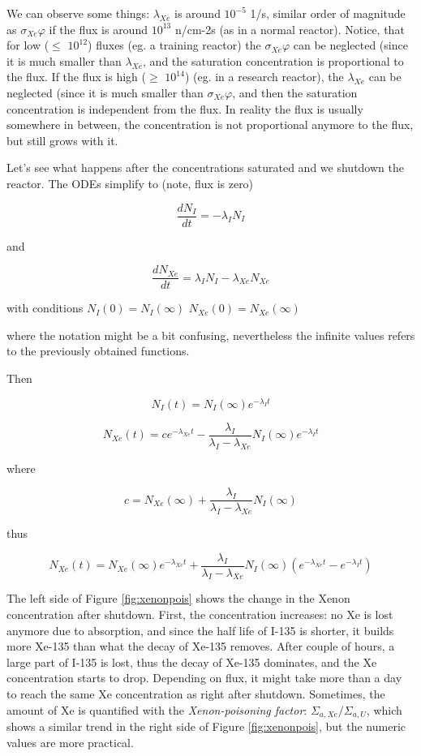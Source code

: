 We can observe some things: $\lambda_{Xe}$ is around $10^{-5}$ 1/s, similar order of magnitude as $\sigma_{Xe}\varphi$ if the flux is around $10^{13}$ n/cm-2s (as in a normal reactor).  Notice, that for low ($\leq$ $10^{12}$) fluxes (eg. a training reactor)  the $\sigma_{Xe}\varphi$ can be neglected (since it is much smaller than $\lambda_{Xe}$, and the saturation concentration is proportional to the flux. If the flux is high ($\geq$ $10^{14}$) (eg. in a research reactor), the $\lambda_{Xe}$ can be neglected (since it is much smaller than $\sigma_{Xe}\varphi$, and then the saturation concentration is independent from the flux. In reality the flux is usually somewhere in between, the concentration is not proportional anymore to the flux, but still grows with it.


Let's see what happens after the concentrations saturated and we shutdown the reactor. The ODEs simplify to (note, flux is zero)

$$ \frac{dN_I}{dt}=-\lambda_IN_I $$

\noindent and

$$ \frac{dN_{Xe}}{dt}= \lambda_IN_I -\lambda_{Xe}N_{Xe} $$

\noindent with conditions $N_I(0)=N_I(\infty)$ $N_{Xe}(0)=N_{Xe}(\infty)$

\noindent where the notation might be a bit confusing, nevertheless the infinite values refers to the previously obtained functions.

Then

$$ N_I(t)=N_I(\infty)e^{-\lambda_It} $$

$$ N_{Xe}(t) = c e^{-\lambda_{Xe}t} - \frac{\lambda_I}{\lambda_I - \lambda_{Xe}}N_I(\infty)e^{-\lambda_{I}t} $$

\noindent where

$$ c = N_{Xe}(\infty)+\frac{\lambda_I}{\lambda_I - \lambda_{Xe}}N_I(\infty) $$

\noindent thus


$$ N_{Xe} (t) = N_{Xe}(\infty)e^{-\lambda_{Xe}t}+\frac{\lambda_I}{\lambda_I - \lambda_{Xe}}N_I(\infty)(e^{-\lambda_{Xe}t} - e^{-\lambda_{I}t}) $$

The left side of Figure \ref{fig:xenonpois} shows the change in the Xenon concentration after shutdown. First, the concentration increases: no Xe is lost anymore due to absorption, and since the half life of I-135 is shorter, it builds more Xe-135 than what the decay of Xe-135 removes. After couple of hours, a large part of I-135 is lost, thus the decay of Xe-135 dominates, and the Xe concentration starts to drop. Depending on flux, it might take more than a day to reach the same Xe concentration as right after shutdown. Sometimes, the amount of Xe is quantified with the \textit{Xenon-poisoning factor}: $\Sigma_{a,Xe}/\Sigma_{a,U}$, which shows a similar trend in the right side of Figure \ref{fig:xenonpois}, but the numeric values are more practical.

